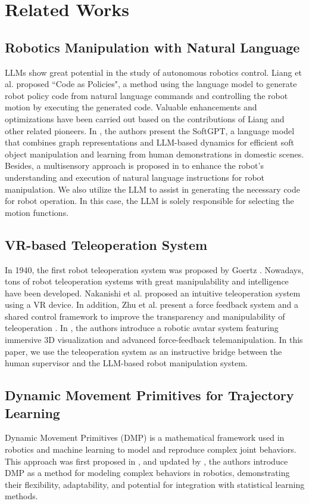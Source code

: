 \documentclass[letterpaper,conference]{ieeeconf}
\begin{document}

\section{Related Works}
\subsection{Robotics Manipulation with Natural Language}
LLMs show great potential in the study of autonomous robotics control. 
Liang et al. \cite{liang2023code} proposed ``Code as Policies", a method using the language model to generate robot policy code from natural language commands and controlling the robot motion by executing the generated code.
Valuable enhancements and optimizations have been carried out based on the contributions of Liang and other related pioneers. In \cite{10341846}, the authors present the SoftGPT, a language model that combines graph representations and LLM-based dynamics for efficient soft object manipulation and learning from human demonstrations in domestic scenes. Besides, a multisensory approach is proposed in \cite{10160906} to enhance the robot's understanding and execution of natural language instructions for robot manipulation. We also utilize the LLM to assist in generating the necessary code for robot operation. In this case, the LLM is solely responsible for selecting the motion functions.

\subsection{VR-based Teleoperation System}
In 1940, the first robot teleoperation system was proposed by Goertz \cite{goertz1964manipulator}. Nowadays, tons of robot teleoperation systems with great manipulability and intelligence have been developed. Nakanishi et al. \cite{nakanishi2020towards} proposed an intuitive teleoperation system using a VR device. In addition, Zhu et al. present a force feedback system and a shared control framework to improve the transparency and manipulability of teleoperation \cite{zhu2020enhancing,10173494}. In \cite{lenz2023nimbro}, the authors introduce a robotic avatar system featuring immersive 3D visualization and advanced force-feedback telemanipulation.
In this paper, we use the teleoperation system as an instructive bridge between the human supervisor and the LLM-based robot manipulation system. 

\subsection{Dynamic Movement Primitives for Trajectory Learning}
Dynamic Movement Primitives (DMP) is a mathematical framework used in robotics and machine learning to model and reproduce complex joint behaviors. This approach was first proposed in \cite{schaal2006dynamic}, and updated by \cite{ijspeert2013dynamical}, the authors introduce DMP as a method for modeling complex behaviors in robotics, demonstrating their flexibility, adaptability, and potential for integration with statistical learning methods. 
\end{document}
